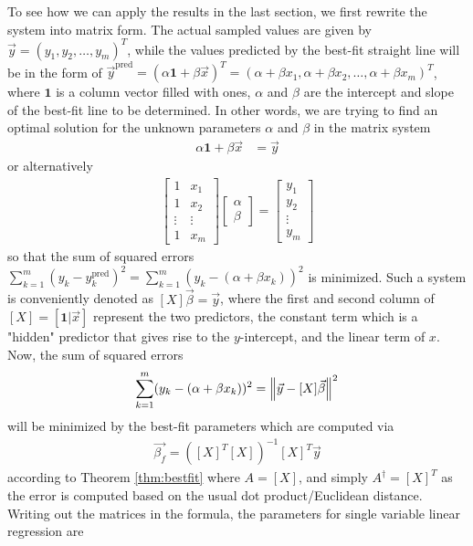To see how we can apply the results in the last section, we first rewrite the system into matrix form. The actual sampled values are given by $\vec{y} = (y_1, y_2, \ldots, y_m)^T$, while the values predicted by the best-fit straight line will be in the form of $\vec{y}^{\text{pred}} = (\alpha\textbf{1} + \beta \vec{x})^T = (\alpha + \beta x_1, \alpha + \beta x_2, \ldots, \alpha + \beta x_m)^T$, where $\textbf{1}$ is a column vector filled with ones, $\alpha$ and $\beta$ are the intercept and slope of the best-fit line to be determined. In other words, we are trying to find an optimal solution for the unknown parameters $\alpha$ and $\beta$ in the matrix system
\begin{align*}
\alpha\textbf{1} + \beta \vec{x} &= \vec{y}
\end{align*}
or alternatively
\begin{align*}
\begin{bmatrix}
1 & x_1 \\
1 & x_2 \\
\vdots & \vdots \\
1 & x_m
\end{bmatrix}
\begin{bmatrix}
\alpha \\
\beta
\end{bmatrix}
=
\begin{bmatrix}
y_1 \\
y_2 \\
\vdots \\
y_m
\end{bmatrix}
\end{align*}
so that the sum of squared errors $\sum_{k=1}^m (y_k - y^{\text{pred}}_k)^2 = \sum_{k=1}^m (y_k - (\alpha + \beta x_k))^2$ is minimized. Such a system is conveniently denoted as $[X]\vec{\beta} = \vec{y}$, where the first and second column of $[X] = [\textbf{1}|\vec{x}]$ represent the two predictors, the constant term which is a "hidden" predictor that gives rise to the $y$-intercept, and the linear term of $x$. Now, the sum of squared errors
\begin{align*}
\sum_{k=1}^m (y_k - (\alpha + \beta x_k))^2 = \norm{\vec{y} - [X]\vec{\beta}}^2    
\end{align*}
will be minimized by the best-fit parameters which are computed via
\begin{align*}
\vec{\beta_f} = ([X]^T[X])^{-1}[X]^T \vec{y}
\end{align*}
according to Theorem \ref{thm:bestfit} where $A = [X]$, and simply $A^\dag = [X]^T$ as the error is computed based on the usual dot product/Euclidean distance. Writing out the matrices in the formula, the parameters for single variable linear regression are
